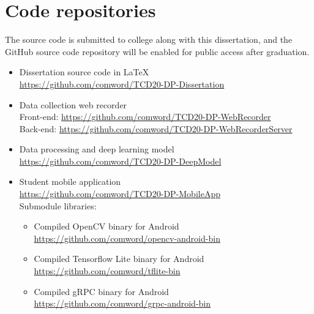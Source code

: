 \chapter{Code repositories}
The source code is submitted to college along with this dissertation, and the GitHub source code repository will be enabled for public access after graduation.
\begin{itemize}
    \item Dissertation source code in \LaTeX \\
    \url{https://github.com/comword/TCD20-DP-Dissertation}
    \item Data collection web recorder \\
    Front-end: \url{https://github.com/comword/TCD20-DP-WebRecorder} \\
    Back-end: \url{https://github.com/comword/TCD20-DP-WebRecorderServer}
    \item Data processing and deep learning model \\ 
    \url{https://github.com/comword/TCD20-DP-DeepModel}
    \item Student mobile application \\
    \url{https://github.com/comword/TCD20-DP-MobileApp} \\
    Submodule libraries:
    \begin{itemize}
        \item Compiled OpenCV binary for Android \\
        \url{https://github.com/comword/opencv-android-bin}
        \item Compiled Tensorflow Lite binary for Android \\
        \url{https://github.com/comword/tflite-bin}
        \item Compiled gRPC binary for Android \\
        \url{https://github.com/comword/grpc-android-bin}
    \end{itemize}
\end{itemize}